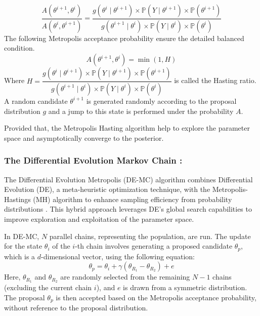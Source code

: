 \documentclass[nonatbib,preprint,12pt,authoryear]{elsarticle}
\begin{document}
$$\dfrac{A(\theta^{i+1},\theta^i)}{A(\theta^i,\theta^{i+1})}= \dfrac{g(\theta^i \mid \theta^{i+1}) \times \mathbb{P}(Y \mid \theta^{i+1}) \times \mathbb{P}(\theta^{i+1})}{g(\theta^{i+1} \mid \theta^i) \times \mathbb{P}(Y\mid \theta^i) \times \mathbb{P}(\theta^i)}$$
The following Metropolis acceptance probability ensure the detailed balanced condition.
\begin{equation}
    \label{eq:Metropolis_ratio}
    A(\theta^{i+1},\theta^i) = \min (1, H)
\end{equation}
Where $H = \dfrac{g(\theta^i \mid \theta^{i+1}) \times \mathbb{P}(Y \mid \theta^{i+1}) \times \mathbb{P}(\theta^{i+1})}{g(\theta^{i+1} \mid \theta^i) \times \mathbb{P}(Y\mid \theta^i) \times \mathbb{P}(\theta^i)}$ is called the Hasting ratio.
A random candidate $\theta^{i+1}$ is generated randomly according to the proposal distribution $g$ and a jump to this state is performed under the probability $A$.

Provided that, the Metropolis Hasting algorithm help to explore the parameter space and asymptotically converge to the posterior.

\subsubsection{The Differential Evolution Markov Chain :}
The Differential Evolution Metropolis (DE-MC) algorithm combines Differential Evolution (DE), a meta-heuristic optimization technique, with the Metropolis-Hastings (MH) algorithm to enhance sampling efficiency from probability distributions \cite{ter_braak_differential_2008}. This hybrid approach leverages DE's global search capabilities to improve exploration and exploitation of the parameter space.

In DE-MC, $N$ parallel chains, representing the population, are run. The update for the state $\theta_i$ of the $i$-th chain involves generating a proposed candidate $\theta_p$, which is a $d$-dimensional vector, using the following equation:
$$\theta_p = \theta_i + \gamma(\theta_{R_1} - \theta_{R_2}) + e$$
Here, $\theta_{R_1}$ and $\theta_{R_2}$ are randomly selected from the remaining $N-1$ chains (excluding the current chain $i$), and $e$ is drawn from a symmetric distribution. The proposal $\theta_p$ is then accepted based on the Metropolis acceptance probability, without reference to the proposal distribution.
\end{document}
